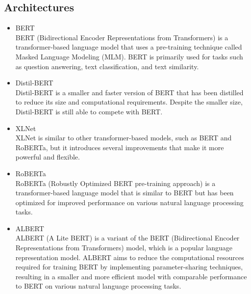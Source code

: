 \documentclass{article}
\begin{document}
 \subsection{Architectures}
\begin{itemize}
    \item BERT\\
    BERT (Bidirectional Encoder Representations from Transformers) is a transformer-based language model that uses a pre-training technique called Masked Language Modeling (MLM). BERT is primarily used for tasks such as question answering, text classification, and text similarity. 
    \item Distil-BERT \\
    Distil-BERT is a smaller and faster version of BERT that has been distilled to reduce its size and computational requirements. Despite the smaller size, Distil-BERT is still able to compete with BERT.
    \item XLNet \\
    XLNet is similar to other transformer-based models, such as BERT and RoBERTa, but it introduces several improvements that make it more powerful and flexible.
    \item RoBERTa \\
    RoBERTa (Robustly Optimized BERT pre-training approach) is a transformer-based language model that is similar to BERT but has been optimized for improved performance on various natural language processing tasks.
    \item ALBERT \\
    ALBERT (A Lite BERT) is a variant of the BERT (Bidirectional Encoder Representations from Transformers) model, which is a popular language representation model. ALBERT aims to reduce the computational resources required for training BERT by implementing parameter-sharing techniques, resulting in a smaller and more efficient model with comparable performance to BERT on various natural language processing tasks.
\end{itemize}
\end{document}
